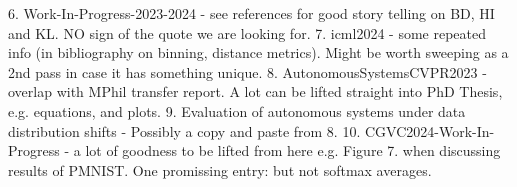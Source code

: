6. Work-In-Progress-2023-2024 - see references for good story telling on BD, HI and KL. NO sign
of the quote we are looking for.
7. icml2024 - some repeated info (in bibliography on binning, distance metrics). Might be worth sweeping as a 2nd pass in case it has something unique.
8. AutonomousSystemsCVPR2023 - overlap with MPhil transfer report. A lot can be lifted straight into PhD Thesis, e.g. equations, and plots.
9. Evaluation of autonomous systems under data distribution shifts - Possibly a copy and paste from 8.
10. CGVC2024-Work-In-Progress - a lot of goodness to be lifted from here e.g. Figure 7. when discussing results of PMNIST.
One promissing entry:
but not softmax averages.





